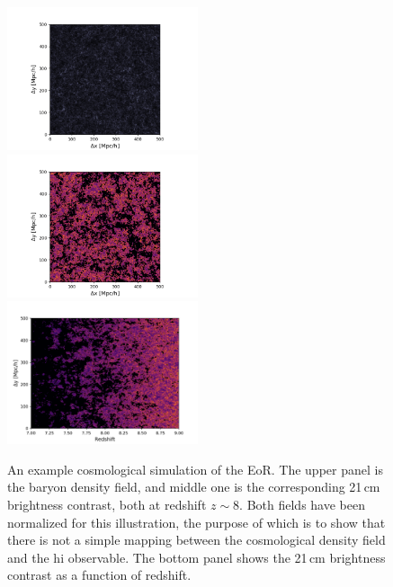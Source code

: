\begin{figure}
\centering
\includegraphics[width=0.5\textwidth]{chapters/eor_intro/figures/density.png}
\includegraphics[width=0.5\textwidth]{chapters/eor_intro/figures/t21.png}
\includegraphics[width=0.5\textwidth]{chapters/eor_intro/figures/t21_z.png}
\caption[An example cosmological simulation of the EoR and the corresponding density field.]{An example cosmological simulation of the EoR. The upper panel is the baryon density field, and middle one is the corresponding 21\,cm brightness contrast, both at redshift $z\sim 8$. Both fields have been normalized for this illustration, the purpose of which is to show that there is not a simple mapping between the cosmological density field and the {\sc hi} observable. The bottom panel shows the 21\,cm brightness contrast as a function of redshift.}
\label{fig:eor_intro_plp_sim}
\end{figure}

